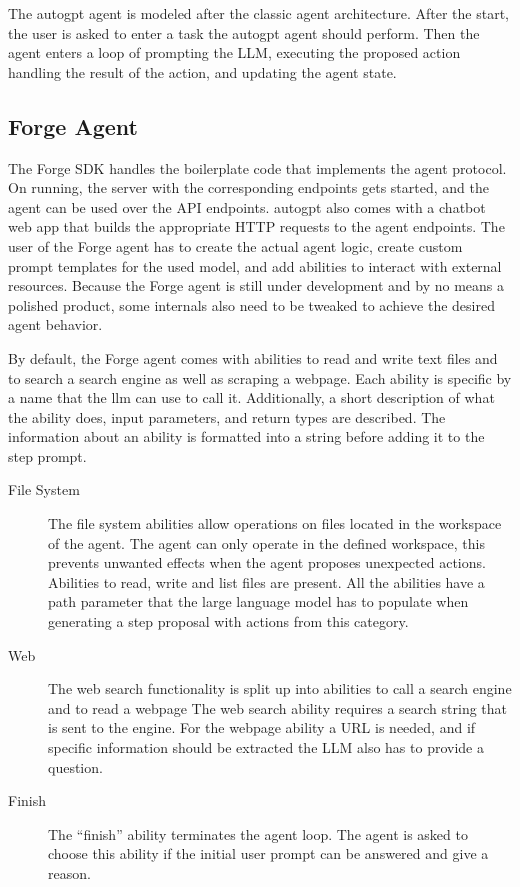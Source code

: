 \documentclass[../main.tex]{subfiles}
\begin{document}
The \gls{autogpt} agent is modeled after the classic agent architecture.
After the start,
the user is asked to enter a task the \gls{autogpt} agent should perform.
Then the agent enters a loop of prompting the LLM,
executing the proposed action
handling the result of the action, and updating the agent state.

\subsection{Forge Agent}
\label{subsec:forge_agent}

The Forge SDK handles the boilerplate code that implements the agent protocol.
On running, the server with the corresponding endpoints gets started,
and the agent can be used over the API endpoints.
\Gls{autogpt} also comes with a chatbot web app
that builds the appropriate HTTP requests to the agent endpoints.
The user of the Forge agent has to create the actual agent logic,
create custom prompt templates for the used model,
and add abilities to interact with external resources.
Because the Forge agent is still under development and by no means a polished product,
some internals also need to be tweaked to achieve the desired agent behavior.

By default,
the Forge agent comes with abilities to read and write text files
and to search a search engine as well as scraping a webpage.
Each ability is specific by a name that the \gls{llm} can use to call it.
Additionally, a short description of what the ability does,
input parameters, and return types are described.
The information about an ability is formatted into a string before adding it to the step prompt.

\begin{description}
      \item[File System] The file system abilities allow operations on files located in the workspace of the agent.
            The agent can only operate in the defined workspace, this prevents unwanted effects when the agent proposes unexpected actions.
            Abilities to read, write and list files are present.
            All the abilities have a path parameter that the large language model has to populate when generating a step proposal with actions from this category.
      \item[Web] The web search functionality is split up into abilities to call a search engine and to read a webpage
            The web search ability requires a search string that is sent to the engine.
            For the webpage ability a URL is needed, and if specific information should be extracted the LLM also has to provide a question.
      \item[Finish] The “finish” ability terminates the agent loop.
            The agent is asked to choose this ability if the initial user prompt can be answered and give a reason.
\end{description}
\end{document}
